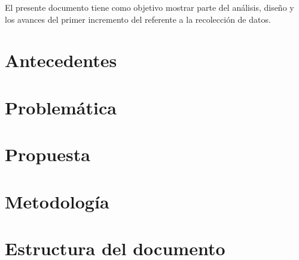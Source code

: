 El presente documento tiene como objetivo mostrar parte del análisis, diseño y los avances del primer incremento del {\it \tituloTrabajo} referente a la recolección de datos. 

\section{Antecedentes}

\section{Problemática}

\section{Propuesta}

\section{Metodología}


\section{Estructura del documento}

